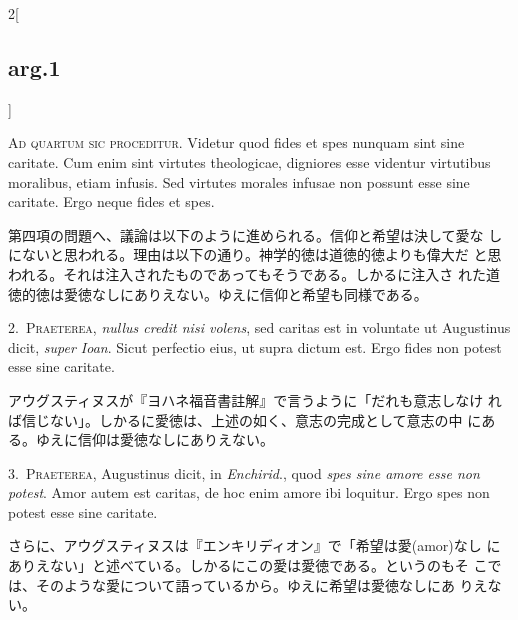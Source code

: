 \documentclass[paper=a4paper,fontsize=10pt,jafontsize=9pt,titlepage]{jlreq}
\begin{document}
\begin{paracol}{2}[\subsection{arg.1}]

{\scshape Ad quartum sic proceditur}. Videtur quod fides et spes
nunquam sint sine caritate. Cum enim sint virtutes theologicae,
digniores esse videntur virtutibus moralibus, etiam infusis. Sed
virtutes morales infusae non possunt esse sine caritate. Ergo neque
fides et spes.

\switchcolumn

第四項の問題へ、議論は以下のように進められる。信仰と希望は決して愛な
 しにないと思われる。理由は以下の通り。神学的徳は道徳的徳よりも偉大だ
 と思われる。それは注入されたものであってもそうである。しかるに注入さ
 れた道徳的徳は愛徳なしにありえない。ゆえに信仰と希望も同様である。


2.~{\scshape Praeterea}, {\itshape nullus credit nisi volens}, sed caritas est in
voluntate ut Augustinus dicit, {\itshape super Ioan}. Sicut perfectio eius, ut
supra dictum est. Ergo fides non potest esse sine caritate.

\switchcolumn

アウグスティヌスが『ヨハネ福音書註解』で言うように「だれも意志しなけ
 れば信じない」。しかるに愛徳は、上述の如く、意志の完成として意志の中
 にある。ゆえに信仰は愛徳なしにありえない。


3.~{\scshape Praeterea}, Augustinus dicit, in {\itshape Enchirid}.,
quod {\itshape spes sine amore esse non potest}. Amor autem est
caritas, de hoc enim amore ibi loquitur. Ergo spes non potest esse
sine caritate.

\switchcolumn

さらに、アウグスティヌスは『エンキリディオン』で「希望は愛(amor)なし
 にありえない」と述べている。しかるにこの愛は愛徳である。というのもそ
 こでは、そのような愛について語っているから。ゆえに希望は愛徳なしにあ
 りえない。

\switchcolumn*[\subsection{s.c.}]


\end{paracol}
\end{document}
